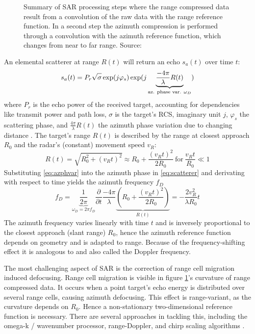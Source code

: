 \begin{figure}[htp]
    \centering
    \def\svgwidth{\linewidth}
    
    \caption{\label{fig_sar_steps}Summary of SAR processing steps where the range compressed data result from a convolution of the raw data with the range reference function. In a second step the azimuth compression is performed through a convolution with the azimuth reference function, which changes from near to far range. Source: \cite{Moreira2013}}
\end{figure}

An elemental scatterer at range \(R(t)\) will return an echo \(s_a(t)\)
over time \(t\): 
\begin{equation} \label{eq:scatterer}
	s_a(t) = P_r \sqrt{\sigma\vphantom{1}} \exp(j\varphi_s)\exp(j \underbrace{\frac{-4\pi}{\lambda}R(t)}_\text{az. phase var. $\omega_D$})
\end{equation}
where \(P_r\) is the echo power of the received target, accounting
for dependencies like transmit power and path loss, \(\sigma\) is the
target's RCS, imaginary unit \(j\), \(\varphi_s\) the scattering phase,
and \(\frac{4\pi}{\lambda}R(t)\) the azimuth phase variation due to
changing distance \cite{Cumming2004}. The target's range \(R(t)\) is
described by the range at closest approach \(R_0\) and the radar's
(constant) movement speed \(v_R\): 
\begin{equation} \label{eq:azphvar}
	R(t) = \sqrt{R_0^2+\left(v_Rt\right)^2} \approx R_0 + \frac{(v_Rt)^2}{2R_0} ~\text{for}~ \frac{v_Rt}{R_0} \ll 1
\end{equation}
Substituting \cref{eq:azphvar} into the azimuth phase in \cref{eq:scatterer} and derivating
with respect to time yields the azimuth frequency \(f_D\) 
\begin{equation}
	f_D = \underbrace{\frac{1}{2\pi}}_{\omega_D = 2\pi f_D} \frac{\partial}{\partial t} \frac{-4\pi}{\lambda}  \underbrace{\left( R_0 + \frac{(v_Rt)^2}{2R_0}  \right)}_{R(t)} = -\frac{2v_R^2}{\lambda R_0}t
\end{equation}
The azimuth frequency varies linearly with time \(t\) and is
inversely proportional to the closest approach (slant range) \(R_0\),
hence the azimuth reference function depends on geometry and is adapted
to range. Because of the frequency-shifting effect it is analogous to
and also called the Doppler frequency.

The most challenging aspect of SAR is the correction of range cell
migration induced defocusing. Range cell migration is visible in figure
\cref{fig_sar_steps}'s curvature of range compressed data. It occurs when a point
target's echo energy is distributed over several range cells, causing
azimuth defocusing. This effect is range-variant, as the curvature
depends on \(R_0\). Hence a non-stationary two-dimensional reference
function is necessary. There are several approaches in tackling this,
including the omega-k / wavenumber processor, range-Doppler, and chirp
scaling algorithms \cite{Moreira2013}.

